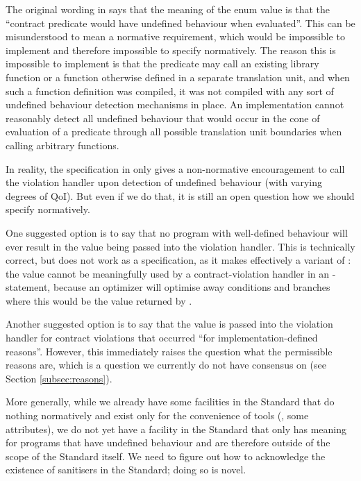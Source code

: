 The original wording in \cite{P2811R5} says that the meaning of the enum value is that the “contract predicate would have undefined behaviour when evaluated”. This can be misunderstood to mean a normative requirement, which would be impossible to implement and therefore impossible to specify normatively. The reason this is impossible to implement is that the predicate may call an existing library function or a function otherwise defined in a separate translation unit, and when such a function definition was compiled, it was not compiled with any sort of undefined behaviour detection mechanisms in place. An implementation cannot reasonably detect all undefined behaviour that would occur in the cone of evaluation of a predicate through all possible translation unit boundaries when calling arbitrary functions.

In reality, the specification in \cite{P2811R5} only gives a non-normative encouragement to call the violation handler upon detection of undefined behaviour (with varying degrees of QoI). But even if we do that, it is still an open question how we should specify \mbox{} normatively.

One suggested option is to say that no program with well-defined behaviour will ever result in the value \mbox{} being passed into the violation handler. This is technically correct, but does not work as a specification, as it makes  \mbox{} effectively a variant of : the value cannot be meaningfully used by a contract-violation handler in an -statement, because an optimizer will optimise away conditions and branches where this would be the value returned by .

Another suggested option is to say that the value \mbox{} is passed into the violation handler for contract violations that occurred ``for implementation-defined reasons''. However, this immediately raises the question what the permissible reasons are, which is a question we currently do not have consensus on (see Section \ref{subsec:reasons}).

More generally, while we already have some facilities in the Standard that do nothing normatively and exist only for the convenience of tools (, some attributes), we do not yet have a facility in the Standard that only has meaning for programs that have undefined behaviour and are therefore outside of the scope of the Standard itself. We need to figure out how to acknowledge the existence of sanitisers in the Standard; doing so is novel.

